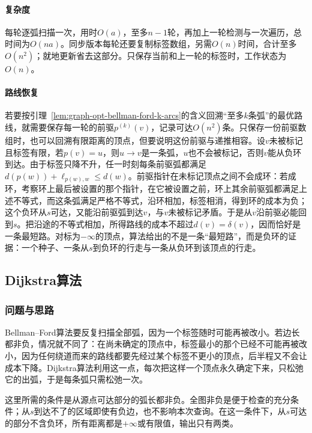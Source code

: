 \paragraph{复杂度}
每轮逐弧扫描一次，用时$O(a)$，至多$n-1$轮，再加上一轮检测与一次遍历，总时间为$O(na)$。同步版本每轮还要复制标签数组，另需$O(n)$时间，合计至多$O(n^2)$；就地更新省去这部分。只保存当前和上一轮的标签时，工作状态为$O(n)$。

\paragraph{路线恢复}
若要按引理~\ref{lem:graph-opt-bellman-ford-k-arcs}的含义回溯“至多$k$条弧”的最优路线，就需要保存每一轮的前驱$p^{(k)}(v)$，记录可达$O(n^2)$条。只保存一份前驱数组时，也可以回溯有限距离的顶点，但要说明这份前驱与递推相容。设$v$未被标记且标签有限，若$p(v)=u$，则$u\to v$是一条弧，$u$也不会被标记，否则$v$能从负环到达。由于标签只降不升，任一时刻每条前驱弧都满足$d(p(w))+\ell_{p(w),w}\leq d(w)$。前驱指针在未标记顶点之间不会成环：若成环，考察环上最后被设置的那个指针，在它被设置之前，环上其余前驱弧都满足上述不等式，而这条弧满足严格不等式，沿环相加，标签相消，得到环的成本为负；这个负环从$s$可达，又能沿前驱弧到达$v$，与$v$未被标记矛盾。于是从$v$沿前驱必能回到$s$。把沿途的不等式相加，所得路线的成本不超过$d(v)=\delta(v)$，因而恰好是一条最短路。对标为$-\infty$的顶点，算法给出的不是一条“最短路”，而是负环的证据：一个种子、一条从$s$到负环的行走与一条从负环到该顶点的行走。

\subsection{Dijkstra算法}
\label{sec:graph-opt-dijkstra}

\subsubsection{问题与思路}

Bellman--Ford算法要反复扫描全部弧，因为一个标签随时可能再被改小。若边长都非负，情况就不同了：在尚未确定的顶点中，标签最小的那个已经不可能再被改小，因为任何绕道而来的路线都要先经过某个标签不更小的顶点，后半程又不会让成本下降。Dijkstra算法利用这一点，每次把这样一个顶点永久确定下来，只松弛它的出弧，于是每条弧只需松弛一次。

这里所需的条件是从源点可达部分的弧长都非负。全图非负是便于检查的充分条件；从$s$到达不了的区域即使有负边，也不影响本次查询。在这一条件下，从$s$可达的部分不含负环，所有距离都是$+\infty$或有限值，输出只有两类。


